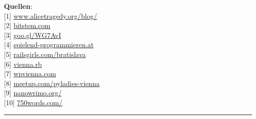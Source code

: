 \documentclass[10pt,a4paper,ngerman,twoside]{article} %
\newcommand{\SepRule}{\noindent	%
\begin{center}
\rule{250pt}{1pt} %
\end{center}
}
\begin{document}
\textbf{Quellen}: \\
{[}1{]} \href{http://www.alicetragedy.org/blog/}{www.alicetragedy.org/blog/} \\
{[}2{]} \href{http://bitstem.com}{bitstem.com} \\
{[}3{]} \href{http://www.alicetragedy.org/blog/?p=6271}{goo.gl/WG7AvI} \\
{[}4{]} \href{http://spielend-programmieren.at}{spielend-programmieren.at} \\
{[}5{]} \href{http://railsgirls.com/bratislava}{railsgirls.com/bratislava} \\
{[}6{]} \href{http://vienna-rb.at/}{vienna.rb} \\
{[}7{]} \href{http://wpvienna.com/}{wpvienna.com} \\
{[}8{]} \href{http://www.meetup.com/pyladies-vienna}{meetup.com/pyladies-vienna} \\
{[}9{]} \href{http://nanowrimo.org/}{nanowrimo.org/} \\
{[}10{]} \href{https://750words.com/}{750words.com/} 



\SepRule
\end{document}
